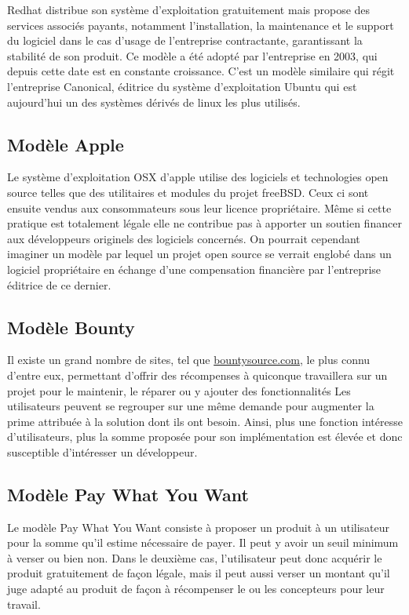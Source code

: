 Redhat distribue son système d'exploitation gratuitement mais propose des
services associés payants, notamment l'installation, la maintenance et le
support du logiciel dans le cas d'usage de l'entreprise contractante,
garantissant la stabilité de son produit.
Ce modèle a été adopté par l'entreprise en 2003, qui depuis cette date est en
constante croissance.
C'est un modèle similaire qui régit l'entreprise Canonical, éditrice du
système d'exploitation Ubuntu qui est aujourd'hui un des systèmes dérivés de
linux les plus utilisés.

    \subsection{Modèle Apple}

Le système d'exploitation OSX d'apple utilise des logiciels et technologies
open source telles que des utilitaires et modules du projet freeBSD\@.
Ceux ci sont ensuite vendus aux consommateurs sous leur licence propriétaire.
Même si cette pratique est totalement légale elle ne contribue pas à apporter
un soutien financer aux développeurs originels des logiciels concernés.
On pourrait cependant imaginer un modèle par lequel un projet open source
se verrait englobé dans un logiciel propriétaire en échange d'une
compensation financière par l'entreprise éditrice de ce dernier.

    \subsection{Modèle Bounty}

Il existe un grand nombre de sites, tel que \url{bountysource.com}, le
plus connu d'entre eux, permettant d'offrir des récompenses à quiconque
travaillera sur un projet pour le maintenir, le réparer ou y ajouter des
fonctionnalités
Les utilisateurs peuvent se regrouper sur une même demande pour augmenter la
prime attribuée à la solution dont ils ont besoin.
Ainsi, plus une fonction intéresse d'utilisateurs, plus la somme proposée pour
son implémentation est élevée et donc susceptible d'intéresser un développeur.

    \subsection{Modèle Pay What You Want}

Le modèle Pay What You Want consiste à proposer un produit à un utilisateur
pour la somme qu'il estime nécessaire de payer. Il peut y avoir un seuil
minimum à verser ou bien non. Dans le deuxième cas, l'utilisateur peut donc
acquérir le produit gratuitement de façon légale, mais il peut aussi verser un
montant qu'il juge adapté au produit de façon à récompenser le ou les
concepteurs pour leur travail.

